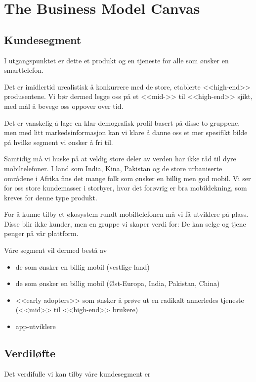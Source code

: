 \section{The Business Model Canvas}

\subsection{Kundesegment}

I utgangspunktet er dette et produkt og en tjeneste for alle som ønsker en
smarttelefon.

Det er imidlertid urealistisk å konkurrere med de store, etablerte <<high-end>>
produsentene.  Vi bør dermed legge oss på et <<mid->> til <<high-end>> sjikt,
med mål å bevege oss oppover over tid.

Det er vanskelig å lage en klar demografisk profil basert på disse to
gruppene, men med litt markedsinformasjon kan vi klare å danne oss et mer
spesifikt bilde på hvilke segment vi ønsker å fri til.

Samtidig må vi huske på at veldig store deler av verden har ikke råd til dyre
mobiltelefoner. I land som India, Kina, Pakistan og de store urbaniserte
områdene i Afrika fins det mange folk som ønsker en billig men god mobil. Vi
ser for oss store kundemasser i storbyer, hvor det forøvrig er bra
mobildekning, som kreves for denne type produkt.

For å kunne tilby et økosystem rundt mobiltelefonen må vi få utviklere på
plass. Disse blir ikke kunder, men en gruppe vi skaper verdi for: De kan selge
og tjene penger på vår plattform.

Våre segment vil dermed bestå av

\begin{itemize}
  \item de som ønsker en billig mobil (vestlige land)
  \item de som ønsker en billig mobil (Øst-Europa, India, Pakistan, China)
  \item <<early adopters>> som ønsker å prøve ut en radikalt annerledes
    tjeneste (<<mid>> til <<high-end>> brukere)
  \item app-utviklere
\end{itemize}

\subsection{Verdiløfte}

Det verdifulle vi kan tilby våre kundesegment er

